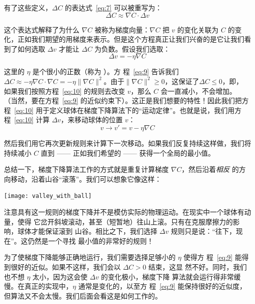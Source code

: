 有了这些定义，$\Delta C$ 的表达式~\eqref{eq:7} 可以被重写为：
\begin{equation}
  \Delta C \approx \nabla C \cdot \Delta v
  \label{eq:9}\tag{9}
\end{equation}

这个表达式解释了为什么 $\nabla C$ 被称为梯度向量：$\nabla C$ 把 $v$ 的变化关联为
$C$ 的变化，正如我们期望的用梯度来表示。但是这个方程真正让我们兴奋的是它让我们看
到了如何选取 $\Delta v$ 才能让 $\Delta C$ 为负数。假设我们选取：
\begin{equation}
  \Delta v = -\eta \nabla C
  \label{eq:10}\tag{10}
\end{equation}

这里的 $\eta$ 是个很小的正数（称为%
  \emph{\learningrate}\index{\learningrate}）。方
程~\eqref{eq:9} 告诉我们$\Delta C \approx -\eta \nabla C \cdot \nabla C = -\eta
\|\nabla C\|^2$。由于$\| \nabla C \|^2 \geq 0$，这保证了$\Delta C \leq 0$，即，
如果我们按照方程~\eqref{eq:10} 的规则去改变 $v$，那么 $C$ 会一直减小，不会增加。
（当然，要在方程~\eqref{eq:9} 的近似约束下）。这正是我们想要的特性！因此我们把方
程~\eqref{eq:10} 用于定义球体在梯度下降算法下的“运动定律”。也就是说，我们用方
程~\eqref{eq:10} 计算 $\Delta v$，来移动球体的位置 $v$：
\begin{equation}
  v \rightarrow v' = v -\eta \nabla C
  \label{eq:11}\tag{11}
\end{equation}

然后我们用它再次更新规则来计算下一次移动。如果我们反复持续这样做，我们将持续减小
$C$ 直到 —— 正如我们希望的 —— 获得一个全局的最小值。

总结一下，梯度下降算法工作的方式就是重复计算梯度 $\nabla C$，然后沿着\emph{相反}
的方向移动，沿着山谷“滚落”。我们可以想象它像这样：
\begin{center}
  \texttt{[image: valley\_with\_ball]}
\end{center}

注意具有这一规则的梯度下降并不是模仿实际的物理运动。在现实中一个球体有动量，使得
它岔开斜坡滚动，甚至（短暂地）往山上滚。只有在克服摩擦力的影响，球体才能保证滚到
山谷。相比之下，我们选择 $\Delta v$ 规则只是说：“往下，现在”。这仍然是一个寻找
最小值的非常好的规则！

为了使梯度下降能够正确地运行，我们需要选择足够小的\learningrate{} $\eta$ 使得方
程~\eqref{eq:9} 能得到很好的近似。如果不这样，我们会以 $\Delta C > 0$ 结束，这显
然不好。同时，我们也不想 $\eta$ 太小，因为这会使 $\Delta v$ 的变化极小，梯度下降
算法就会运行得非常缓慢。在真正的实现中，$\eta$ 通常是变化的，以至方
程~\eqref{eq:9} 能保持很好的近似度，但算法又不会太慢。我们后面会看这是如何工作的。

